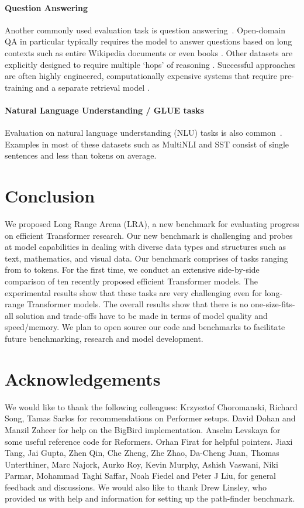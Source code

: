 \documentclass{article} \usepackage{iclr2021_conference,times}
\begin{document}
\paragraph{Question Answering} Another commonly used evaluation task is question answering~\citep[QA;][]{zaheer2020big}. Open-domain QA in particular typically requires the model to answer questions based on long contexts such as entire Wikipedia documents \citep{Joshi2017triviaqa,Kwiatkowski2019naturalquestions} or even books \citep{Kocisky2018narrativeqa}. Other datasets are explicitly designed to require multiple `hops' of reasoning \citep{Welbl2018wikihop,Yang2018hotpotqa}. Successful approaches are often highly engineered, computationally expensive systems that require pre-training and a separate retrieval model \citep{Lee2019latent,Guu2020realm}. 


\paragraph{Natural Language Understanding / GLUE tasks} Evaluation on natural language understanding (NLU) tasks is also common~\citep{wang2020linformer}. Examples in most of these datasets such as MultiNLI \citep{Williams2018multinli} and SST \citep{Socher2013sst} consist of single sentences and less than  tokens on average.


\section{Conclusion}
We proposed Long Range Arena (LRA), a new benchmark for evaluating progress on efficient Transformer research. Our new benchmark is challenging and probes at model capabilities in dealing with diverse data types and structures such as text, mathematics, and visual data. Our benchmark comprises of tasks ranging from  to  tokens. For the first time, we conduct an extensive side-by-side comparison of ten recently proposed efficient Transformer models. The experimental results show that these tasks are very challenging even for long-range Transformer models. The overall results show that there is no one-size-fits-all solution and trade-offs have to be made in terms of model quality and speed/memory. We plan to open source our code and benchmarks to facilitate future benchmarking, research and model development.

\section{Acknowledgements}
We would like to thank the following colleagues: Krzysztof Choromanski, Richard Song, Tamas Sarlos for recommendations on Performer setups. David Dohan and Manzil Zaheer for help on the BigBird implementation. Anselm Levskaya for some useful reference code for Reformers. Orhan Firat for helpful pointers. Jiaxi Tang, Jai Gupta, Zhen Qin, Che Zheng, Zhe Zhao, Da-Cheng Juan, Thomas Unterthiner, Marc Najork, Aurko Roy, Kevin Murphy, Ashish Vaswani, Niki Parmar, Mohammad Taghi Saffar, Noah Fiedel and Peter J Liu, for general feedback and discussions. We would also like to thank Drew Linsley, who provided us with help and information for setting up the path-finder benchmark.   
\end{document}
